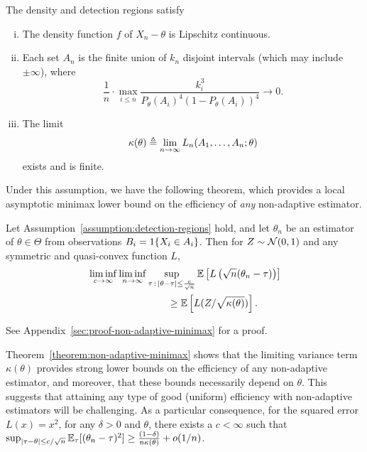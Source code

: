 \begin{assumption}
  \label{assumption:detection-regions}
  The density and detection regions satisfy
  \begin{enumerate}[(i)]
  \item \label{item:lipschitz-density}
    The density function $f$ of $X_n - \theta$ is Lipschitz continuous.
  \item \label{item:finite-intervals}
    Each set $A_n$ is the finite union of $k_n$ disjoint intervals
    (which may include $\pm \infty$), where
    \begin{equation*}
      \frac{1}{n} \cdot \max_{i \le n} \frac{k_i^3}{P_\theta(A_i)^4
        (1 - P_\theta(A_i))^4} \to 0.
    \end{equation*}
  \item \label{item:limit-variance}
    The limit
    \begin{equation}
      \label{eqn:LAN-limit}
      \kappa(\theta) \triangleq \lim_{n\to \infty} L_n(A_1,\ldots,A_n; \theta)
    \end{equation}
    exists and is finite.
  \end{enumerate}
\end{assumption}

Under this assumption, we have the following theorem, which provides
a local asymptotic minimax lower bound on the efficiency of
\emph{any} non-adaptive estimator.
\begin{theorem}
  \label{theorem:non-adaptive-minimax}
  Let Assumption~\ref{assumption:detection-regions} hold, and
  let ${\theta}_n$ be an estimator of $\theta \in \Theta$ from
  observations $B_i = 1\!\left\{X_i \in A_i\right\}$.
  Then for $Z \sim \mathcal{N}(0, 1)$ and any
  symmetric and quasi-convex function $L$,
  \begin{align*}
    & \liminf_{c \to \infty} \liminf_{n \to \infty}
    \sup_{\tau\,:\,|\theta-\tau| \leq \frac{c}{\sqrt{n} }}
    \mathbb{E} \left[ L\left( \sqrt{n}({\theta}_{n} - \tau) \right) \right] \\
    & \qquad \qquad \qquad \qquad \geq
    \mathbb{E}\left[ L (Z/\sqrt{\kappa(\theta)}) \right].
  \end{align*}
\end{theorem}
\noindent
See Appendix~\ref{sec:proof-non-adaptive-minimax} for a proof.

Theorem~\ref{theorem:non-adaptive-minimax} shows that the limiting variance
term $\kappa(\theta)$ provides strong lower bounds on the efficiency of any
non-adaptive estimator, and moreover, that these bounds necessarily depend
on $\theta$. This suggests that attaining any type of good (uniform)
efficiency with non-adaptive estimators will be challenging.  As a
particular consequence, for the squared error $L(x) = x^2$, for any $\delta
> 0$ and $\theta$, there exists a $c < \infty$ such that $\sup_{|\tau -
  \theta| \le c / \sqrt{n}} \mathbb{E}_\tau[(\theta_n - \tau)^2] \ge \frac{(1 -
  \delta)}{n \kappa(\theta)} + o(1/n)$.

